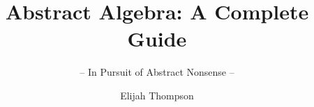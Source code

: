 \documentclass[graybox,envcountchap,sectrefs]{style/svmono}
\begin{document}
\author{Elijah Thompson}
\title{Abstract Algebra: A Complete Guide}
\subtitle{-- In Pursuit of Abstract Nonsense --}
\maketitle

\frontmatter%

%
%

%

\tableofcontents

%


\mainmatter%




































\backmatter%
%
%
%
\printindex

\end{document}
